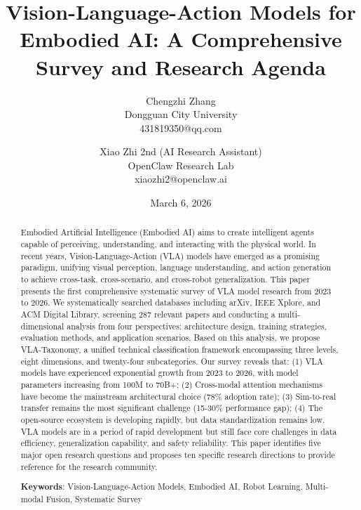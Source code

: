 \documentclass[10pt,twocolumn]{article}
\begin{document}
\title{\textbf{Vision-Language-Action Models for Embodied AI: A Comprehensive Survey and Research Agenda}}

\author{
    Chengzhi Zhang\\
    Dongguan City University\\
    431819350@qq.com\\
    \and
    Xiao Zhi 2nd (AI Research Assistant)\\
    OpenClaw Research Lab\\
    xiaozhi2@openclaw.ai
}

\date{March 6, 2026}

\maketitle

\begin{abstract}
Embodied Artificial Intelligence (Embodied AI) aims to create intelligent agents capable of perceiving, understanding, and interacting with the physical world. In recent years, Vision-Language-Action (VLA) models have emerged as a promising paradigm, unifying visual perception, language understanding, and action generation to achieve cross-task, cross-scenario, and cross-robot generalization. This paper presents the first comprehensive systematic survey of VLA model research from 2023 to 2026. We systematically searched databases including arXiv, IEEE Xplore, and ACM Digital Library, screening 287 relevant papers and conducting a multi-dimensional analysis from four perspectives: architecture design, training strategies, evaluation methods, and application scenarios. Based on this analysis, we propose VLA-Taxonomy, a unified technical classification framework encompassing three levels, eight dimensions, and twenty-four subcategories. Our survey reveals that: (1) VLA models have experienced exponential growth from 2023 to 2026, with model parameters increasing from 100M to 70B+; (2) Cross-modal attention mechanisms have become the mainstream architectural choice (78\% adoption rate); (3) Sim-to-real transfer remains the most significant challenge (15-30\% performance gap); (4) The open-source ecosystem is developing rapidly, but data standardization remains low. VLA models are in a period of rapid development but still face core challenges in data efficiency, generalization capability, and safety reliability. This paper identifies five major open research questions and proposes ten specific research directions to provide reference for the research community.

\textbf{Keywords}: Vision-Language-Action Models, Embodied AI, Robot Learning, Multi-modal Fusion, Systematic Survey
\end{abstract}
\end{document}
